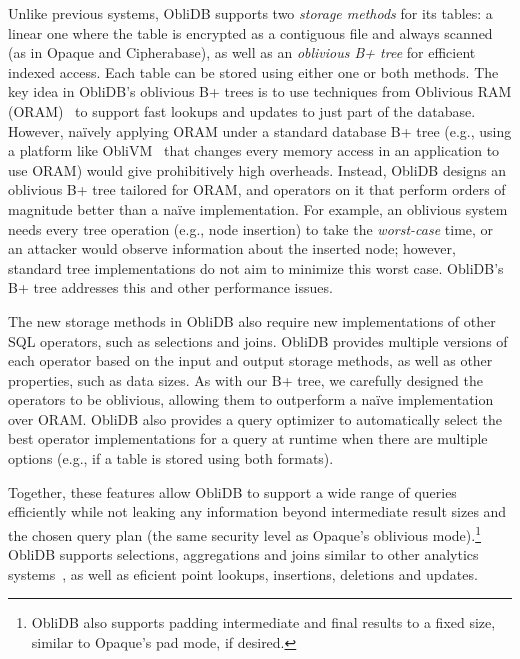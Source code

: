 \documentclass[letterpaper,twocolumn,10pt]{article}
\def\name/{ObliDB}
\begin{document}
Unlike previous systems, \name/ supports two \emph{storage methods} for its tables: a linear one where the table is encrypted as a contiguous file and always scanned (as in Opaque and Cipherabase), as well as an \emph{oblivious B+ tree} for efficient indexed access.
Each table can be stored using either one or both methods.
The key idea in \name/'s oblivious B+ trees is to use techniques from Oblivious RAM (ORAM)~\cite{SDS+13} to support fast lookups and updates to just part of the database.
However, na\"ively applying ORAM under a standard database B+ tree (e.g., using a platform like ObliVM~\cite{oblivm} that changes every memory access in an application to use ORAM) would give prohibitively high overheads.
Instead, \name/ designs an oblivious B+ tree tailored for ORAM, and operators on it that perform orders of magnitude better than a na\"ive implementation.
For example, an oblivious system needs every tree operation (e.g., node insertion) to take the \emph{worst-case} time, or an attacker would observe information about the inserted node; however, standard tree implementations do not aim to minimize this worst case.
\name/'s B+ tree addresses this and other performance issues.

The new storage methods in \name/ also require new implementations of other SQL operators, such as selections and joins.
\name/ provides multiple versions of each operator based on the input and output storage methods, as well as other properties, such as data sizes.
As with our B+ tree, we carefully designed the operators to be oblivious, allowing them to outperform a na\"ive implementation over ORAM.
\name/ also provides a query optimizer to automatically select the best operator implementations for a query at runtime when there are multiple options (e.g., if
a table is stored using both formats).

Together, these features allow \name/ to support a wide range of queries efficiently while not leaking any information beyond intermediate result sizes and the chosen query plan (the same security level as Opaque's oblivious mode).\footnote{
    \name/ also supports padding intermediate and final results to a fixed size, similar to Opaque's pad mode, if desired.
}
\name/ supports selections, aggregations and joins similar to other analytics systems~\cite{ZDB+17,cipherbase}, as well as eficient point lookups, insertions, deletions and updates.
\end{document}
